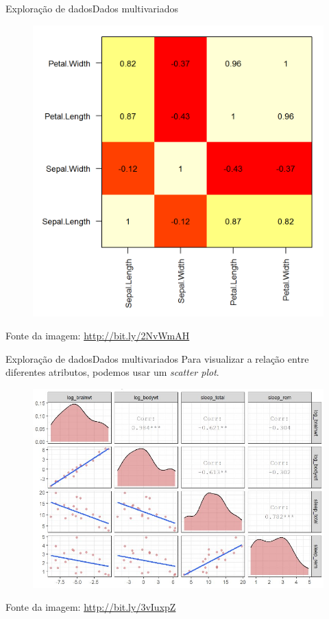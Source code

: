 \documentclass[t]{beamer}
\begin{document}
\begin{ftst}{Exploração de dados}{Dados multivariados}
\begin{figure}
    \centering
    \includegraphics[scale=0.5]{Figuras/slide01_08.png}
\end{figure}
\scriptsize
Fonte da imagem: \href{http://bit.ly/2NvWmAH}{http://bit.ly/2NvWmAH}

\end{ftst}


\begin{ftst}{Exploração de dados}{Dados multivariados}
Para visualizar a relação entre diferentes atributos, podemos usar um \textit{scatter plot}.
\begin{figure}
    \centering
    \includegraphics[scale=0.4]{Figuras/slide01_09.jpg}
\end{figure}
\scriptsize
Fonte da imagem: \href{http://bit.ly/3vIuxpZ}{http://bit.ly/3vIuxpZ}

\end{ftst}
\end{document}
